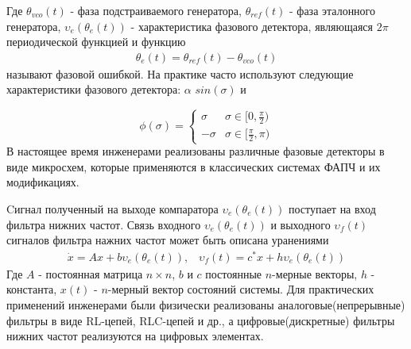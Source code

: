 \documentclass[a4paper,14pt]{extarticle} %
\begin{document}
Где $\theta_{vco}(t)$ - фаза подстраиваемого генератора, $\theta_{ref}(t)$ - фаза эталонного генератора, $\upsilon_e(\theta_e(t))$ - характеристика фазового детектора, являющаяся $2\pi$ периодической функцией и функцию
 \begin{equation*}
 \begin{aligned}
\theta_e(t) = \theta_{ref}(t) - \theta_{vco}(t)
 \end{aligned}
\end{equation*}
называют фазовой ошибкой. На практике часто используют следующие характеристики фазового детектора: $\alpha$ $sin(\sigma)$ и 

\begin{equation*}
\phi(\sigma) = 
 \begin{cases}
   \sigma &\text{$\sigma \in [0,  \frac{\pi}{2})$}\\
   -\sigma &\text{$\sigma \in [\frac{\pi}{2},  \pi)$}
 \end{cases}
\end{equation*}
В настоящее время инженерами реализованы различные фазовые детекторы в виде микросхем, которые применяются в классических системах ФАПЧ и их модификациях.

Cигнал полученный на выходе компаратора $\upsilon_e(\theta_e(t))$ поступает на вход фильтра нижних частот. Связь входного $\upsilon_e(\theta_e(t))$ и выходного $\upsilon_f(t)$ сигналов фильтра нажних частот может быть описана уранениями
 \begin{equation*}
 \begin{aligned}
\dot{x} = Ax + b\upsilon_e(\theta_e(t)) \text{,} \quad 
\upsilon_f(t) = c^*x + h\upsilon_e(\theta_e(t))
 \end{aligned}
\end{equation*}
Где $A$ - постоянная матрица $n \times n$, $b$ и $c$ постоянные $n$-мерные векторы, $h$ - константа, $x(t)$ - $n$-мерный вектор состояний системы. Для практических применений инженерами были физически реализованы аналоговые(непрерывные) фильтры в виде RL-цепей, RLC-цепей и др., а цифровые(дискретные) фильтры нижних частот реализуются на цифровых элементах.
\end{document}
